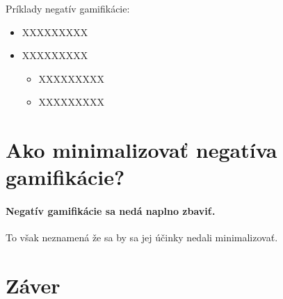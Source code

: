 \documentclass[10pt,twoside,slovak,a4paper]{article}
\begin{document}
Príklady negatív gamifikácie:

\begin{itemize}
\item XXXXXXXXX
\item XXXXXXXXX
	\begin{itemize}
	\item XXXXXXXXX
	\item XXXXXXXXX
	\end{itemize}
\end{itemize}


\section{Ako minimalizovať negatíva gamifikácie?} \label{MinimalizovanieNegatGamif}

\paragraph{Negatív gamifikácie sa nedá naplno zbaviť.}
To však neznamená že sa by sa jej účinky nedali minimalizovať.


\section{Záver} \label{Zaver} %






\end{document}
